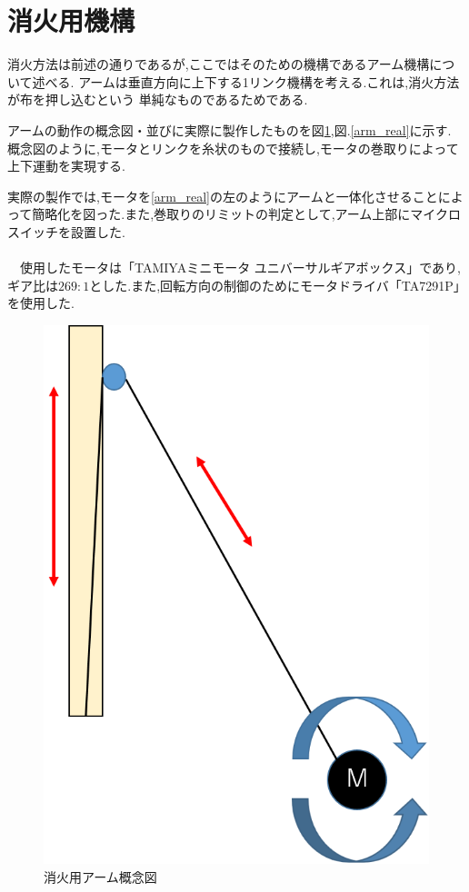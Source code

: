 \documentclass[10pt,a4j]{ujarticle}
\begin{document}
\section{消火用機構}
消火方法は前述の通りであるが,ここではそのための機構であるアーム機構について述べる.
アームは垂直方向に上下する1リンク機構を考える.これは,消火方法が布を押し込むという
単純なものであるためである.

アームの動作の概念図・並びに実際に製作したものを図\ref{arm_con},図.\ref{arm_real}に示す.
概念図のように,モータとリンクを糸状のもので接続し,モータの巻取りによって上下運動を実現する.

実際の製作では,モータを\ref{arm_real}の左のようにアームと一体化させることによって簡略化を図った.また,巻取りのリミットの判定として,アーム上部にマイクロスイッチを設置した.
\\
\\
\ \ 使用したモータは「TAMIYAミニモータ ユニバーサルギアボックス」であり,ギア比は$269:1$とした.また,回転方向の制御のためにモータドライバ「TA7291P」を使用した.

\begin{figure}[h]
 \centering
   \includegraphics[clip,scale=0.4]{./picture/arm_img.png}
   \caption{消火用アーム概念図}
 \label{arm_con}
\end{figure}
\end{document}
